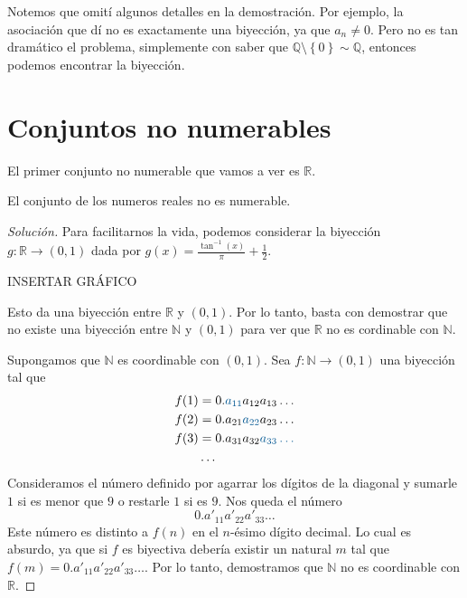Notemos que omití algunos detalles en la demostración. Por ejemplo, la asociación que dí no es exactamente una biyección, ya que $a_n \neq 0$. Pero no es tan dramático el problema, simplemente con saber que $\mathbb{Q} \setminus \left\{ 0 \right\} \sim \mathbb{Q}$, entonces podemos encontrar la biyección.


\section{Conjuntos no numerables}

El primer conjunto no numerable que vamos a ver es $\mathbb{R}$.

\begin{proposition}
	El conjunto de los numeros reales no es numerable.
\end{proposition}

\begin{proof}[Solución]
	Para facilitarnos la vida, podemos considerar la biyección $g: \mathbb{R} \to (0, 1)$ dada por $g(x) = \frac{\tan^{-1} (x)}{\pi} + \frac{1}{2}$.
	\begin{center}
		\color{red} INSERTAR GRÁFICO
	\end{center}
	Esto da una biyección entre $\mathbb{R}$ y $(0, 1)$. Por lo tanto, basta con demostrar que no existe una biyección entre $\mathbb{N}$ y $(0, 1)$ para ver que $\mathbb{R}$ no es cordinable con $\mathbb{N}$.

	Supongamos que $\mathbb{N}$ es coordinable con $(0, 1)$. Sea $f: \mathbb{N} \to (0, 1)$ una biyección tal que
	\begin{align*}
		f(1) & = 0.\textcolor{accentcolor}{a_{11}} a_{12}a_{13}\dots \\
		f(2) & = 0.a_{21}\textcolor{accentcolor}{a_{22}}a_{23}\dots  \\
		f(3) & = 0.a_{31}a_{32}\color{accentcolor}{a_{33}}\dots      \\
		     & \dots
	\end{align*}
	Consideramos el número definido por agarrar los dígitos de la diagonal y sumarle $1$ si es menor que $9$ o restarle $1$ si es $9$. Nos queda el número
	$$
		0.a'_{11}a'_{22}a'_{33}\dots
	$$
	Este número es distinto a $f(n)$ en el $n$-ésimo dígito decimal. Lo cual es absurdo, ya que si $f$ es biyectiva debería existir un natural $m$ tal que $f(m) = 0.a'_{11}a'_{22}a'_{33}\dots$. Por lo tanto, demostramos que $\mathbb{N}$ no es coordinable con $\mathbb{R}$.
\end{proof}

